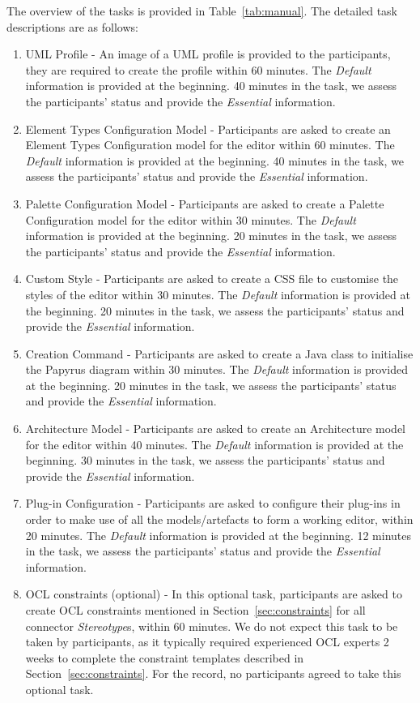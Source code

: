 The overview of the tasks is provided in Table~\ref{tab:manual}. The detailed task descriptions are as follows:
\begin{enumerate}
	\item UML Profile - An image of a UML profile is provided to the participants, they are required to create the profile within 60 minutes.
	The \textit{Default} information is provided at the beginning. 
	40 minutes in the task, we assess the participants' status and provide the \textit{Essential} information.
	\item Element Types Configuration Model - Participants are asked to create an Element Types Configuration model for the editor within 60 minutes. 
	The \textit{Default} information is provided at the beginning. 
	40 minutes in the task, we assess the participants' status and provide the \textit{Essential} information.
	\item Palette Configuration Model - Participants are asked to create a Palette Configuration model for the editor within 30 minutes.
	 The \textit{Default} information is provided at the beginning.
	20 minutes in the task, we assess the participants' status and provide the \textit{Essential} information.
	\item Custom Style - Participants are asked to create a CSS file to customise the styles of the editor within 30 minutes.
	The \textit{Default} information is provided at the beginning. 
	20 minutes in the task, we assess the participants' status and provide the \textit{Essential} information.
	\item Creation Command - Participants are asked to create a Java class to initialise the Papyrus diagram within 30 minutes.
	The \textit{Default} information is provided at the beginning. 
	20 minutes in the task, we assess the participants' status and provide the \textit{Essential} information.
	\item Architecture Model - Participants are asked to create an Architecture model for the editor within 40 minutes.
	The \textit{Default} information is provided at the beginning. 
	30 minutes in the task, we assess the participants' status and provide the \textit{Essential} information.
	\item Plug-in Configuration - Participants are asked to configure their plug-ins in order to make use of all the models/artefacts to form a working editor, within 20 minutes.
	The \textit{Default} information is provided at the beginning. 
	12 minutes in the task, we assess the participants' status and provide the \textit{Essential} information.
	\item OCL constraints (optional) - In this optional task, participants are asked to create OCL constraints mentioned in Section~\ref{sec:constraints} for all connector \textit{Stereotype}s, within 60 minutes. 
	We do not expect this task to be taken by participants, as it typically required experienced OCL experts 2 weeks to complete the constraint templates described in Section~\ref{sec:constraints}.
	For the record, no participants agreed to take this optional task.
\end{enumerate}

